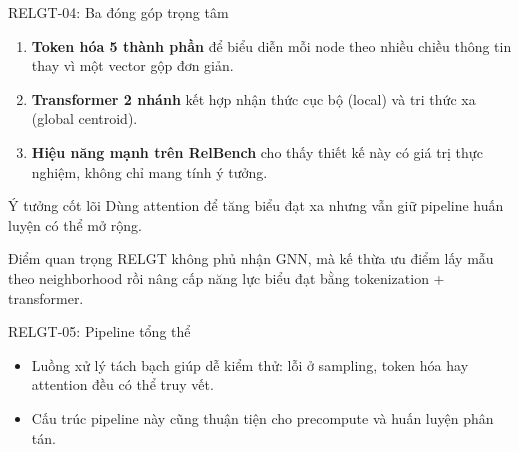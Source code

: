 \documentclass[aspectratio=169,11pt]{beamer}
\begin{document}
\begin{frame}{RELGT-04: Ba đóng góp trọng tâm}
  \begin{enumerate}
    \item \textbf{Token hóa 5 thành phần} để biểu diễn mỗi node theo nhiều chiều thông tin thay vì một vector gộp đơn giản.
    \item \textbf{Transformer 2 nhánh} kết hợp nhận thức cục bộ (local) và tri thức xa (global centroid).
    \item \textbf{Hiệu năng mạnh trên RelBench} cho thấy thiết kế này có giá trị thực nghiệm, không chỉ mang tính ý tưởng.
  \end{enumerate}
  \begin{block}{Ý tưởng cốt lõi}
    Dùng attention để tăng biểu đạt xa nhưng vẫn giữ pipeline huấn luyện có thể mở rộng.
  \end{block}
\begin{exampleblock}{Điểm quan trọng}
  RELGT không phủ nhận GNN, mà kế thừa ưu điểm lấy mẫu theo neighborhood rồi nâng cấp năng lực biểu đạt bằng tokenization + transformer.
\end{exampleblock}
\end{frame}

\begin{frame}{RELGT-05: Pipeline tổng thể}
  \begin{center}
  \end{center}
\begin{itemize}
  \item Luồng xử lý tách bạch giúp dễ kiểm thử: lỗi ở sampling, token hóa hay attention đều có thể truy vết.
  \item Cấu trúc pipeline này cũng thuận tiện cho precompute và huấn luyện phân tán.
\end{itemize}
\end{frame}
\end{document}
